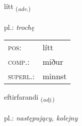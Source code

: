 \documentclass[frontgrid, backgrid]{flacards}\usepackage[]{graphicx}\usepackage[]{xcolor}
\begin{document}
\renewcommand{\flhead}{\vskip5pt \fboxsep=0pt {\small\bfseries\footnotesize Atviksorð | Adverb}}
\renewcommand{\fcfoot}{\vskip5pt \fboxsep=0pt \hspace{2pt}{\small\bfseries\footnotesize 1K}}

\renewcommand{\blhead}{\vskip5pt {\small\bfseries\footnotesize Atviksorð | Adverb }}
\renewcommand{\bcfoot}{\vskip5pt \hspace{2pt}{\small\bfseries\footnotesize 1K}}


{lítt \small{\textsubscript{(\textit{adv.})}} \\[1ex] %
\textphonetic{[liht]} \\
pl.: \emph{trochę} \\  [2ex]
\renewcommand*{\arraystretch}{0.8}
\begin{tabular}{ll}
\textsc{pos}: & lítt \\ 
\textsc{comp.}: & miður \\ 
\textsc{superl.}: & minnst \\
\end{tabular}
}

\renewcommand{\flhead}{\vskip5pt \fboxsep=0pt {\small\bfseries\footnotesize Lýsingarorð | Adjective}}
\renewcommand{\fcfoot}{\vskip5pt \fboxsep=0pt \hspace{2pt}{\small\bfseries\footnotesize 1K}}

\renewcommand{\blhead}{\vskip5pt {\small\bfseries\footnotesize Lýsingarorð | Adjective }}
\renewcommand{\bcfoot}{\vskip5pt \hspace{2pt}{\small\bfseries\footnotesize 1K}}


{eftirfarandi \small{\textsubscript{(\textit{adj.})}} \\[1ex] %
 \\
pl.: \emph{następujący, kolejny} \\  [2ex]
\renewcommand*{\arraystretch}{0.8}
}
\end{document}
